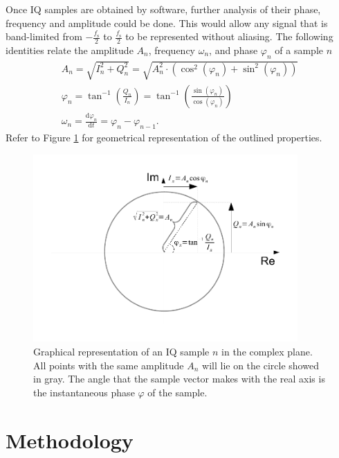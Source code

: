 \documentclass[a4paper,12pt,twoside,openright]{report}
\begin{document}
Once IQ samples are obtained by software, further analysis of their phase, frequency and amplitude could be done. This would allow any signal that is band-limited from $-\frac{f_\text{s}}{2}$ to $\frac{f_\text{s}}{2}$ to be represented without aliasing. The following identities relate the amplitude $A_{n}$, frequency $\omega_{n}$, and phase $\varphi_{n}$ of a sample $n$
\begin{subequations}
\begin{align}
A_{n} = \sqrt{I_n^2+Q_n^2} = \sqrt{A_{n}^2 \cdot (\cos^2(\varphi_n) + \sin^2(\varphi_n))} \\
\varphi_{n} = \tan^{-1}\left(\frac{Q_{n}}{I_{n}}\right) = \tan^{-1}\left(\frac{\sin(\varphi_{n})}{\cos(\varphi_{n})}\right) \\
\omega_{n} = \frac{\text{d} \varphi_{n}}{\text{d} t} = \varphi_{n} - \varphi_{n-1} .
\end{align}
\end{subequations}
Refer to Figure \ref{fig:IQ} for geometrical representation of the outlined properties.

\begin{figure}
\centering
\includegraphics[width=0.9\textwidth]{iqdrawing}
  \caption{Graphical representation of an IQ sample $n$ in the complex plane. All points with the same amplitude $A_{n}$ will lie on the circle showed in gray. The angle that the sample vector makes with the real axis is the instantaneous phase $\varphi$ of the sample.}
  \label{fig:IQ}
\end{figure}

\chapter{Methodology} 
\label{chap:methodology}
\end{document}
